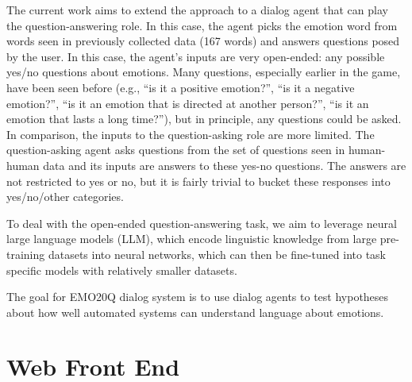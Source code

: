 \documentclass[conference]{IEEEtran}
\begin{document}
The current work aims to extend the approach to a dialog agent that
can play the question-answering role. In this case, the agent picks
the emotion word from words seen in previously collected data (167
words) and answers questions posed by the user. In this case, the
agent's inputs are very open-ended: any possible yes/no questions
about emotions.  Many questions, especially earlier in the game, have
been seen before (e.g., ``is it a positive emotion?'', ``is it a
negative emotion?'', ``is it an emotion that is directed at another
person?'', ``is it an emotion that lasts a long time?''), but in
principle, any questions could be asked.  In comparison, the inputs to
the question-asking role are more limited.  The question-asking agent
asks questions from the set of questions seen in human-human data and
its inputs are answers to these yes-no questions. The answers are not
restricted to yes or no, but it is fairly trivial to bucket these
responses into yes/no/other categories.

To deal with the open-ended question-answering task, we aim to
leverage neural large language models (LLM), which encode linguistic
knowledge from large pre-training datasets into neural networks,
which can then be fine-tuned into task specific models with relatively
smaller datasets.  %


The goal for EMO20Q dialog system is to use dialog agents to test
hypotheses about how well automated systems can understand language
about emotions.




\section{Web Front End}
\end{document}
